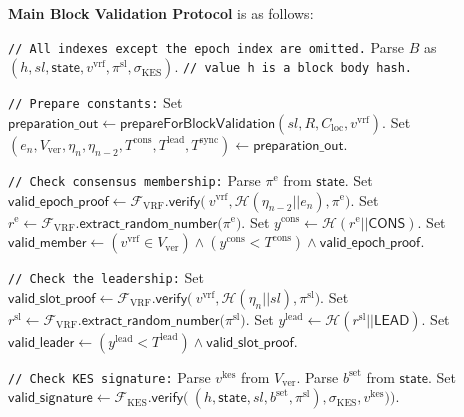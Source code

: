 \bigbreak
\bigbreak
\noindent
{}
\textbf{Main Block Validation Protocol}\label{apndx:block-validation-protocol} is as follows:
\begin{protocol}
    \caption{$\textsf{IsValidBlock}(P, \text{sid}, R, \mathcal{C}_{\text{loc}}, B, \{S_k^{\text{id}}\}_{k=1}^K, \{f^{\text{lead}}_k\}_{k=1}^K, \{f^{\text{cons}}_k\}_{k=1}^K)$}
    \begin{algorithmic}[1]
        \noindent
        \lstinline|// All indexes except the epoch index are omitted.|
        \State Parse $B$ as ${(h, sl, \textsf{state}, v^{\text{vrf}}, \pi^{\text{sl}}, \sigma_{\text{KES}})}$. \lstinline|// value h is a block body hash.|

        \noindent
        \lstinline|// Prepare constants:|
        \State Set $\textsf{preparation\_out} \leftarrow \textsf{prepareForBlockValidation}(sl, R, C_{\text{loc}}, v^{\text{vrf}})$.
        \State Set $(e_n, V_{\text{ver}}, \eta_{n}, \eta_{n - 2}, T^{\text{cons}}, T^{\text{lead}}, T^{\text{sync}}) \leftarrow \textsf{preparation\_out}$.

        \noindent
        \lstinline|// Check consensus membership:|
        \State Parse ${\pi^{\text{e}}}$ from $\textsf{state}$.
        \State Set $\textsf{valid\_epoch\_proof} \leftarrow \mathcal{F}_{\text{VRF}}\textsf{.verify(}\
        v^{\text{vrf}}, \mathcal{H}(\eta_{n - 2} || e_n),\pi^{\text{e}} \textsf{)}$.
        \State Set ${r^{\text{e}} \leftarrow \mathcal{F}_{\text{VRF}}\textsf{.extract\_random\_number(}\pi^{\text{e}}\textsf{)}}$.
        \State Set ${y^{\text{cons}} \leftarrow {\mathcal{H}(r^{\text{e}} || \textsf{CONS})}}$.
        \State Set ${\textsf{valid\_member} \leftarrow (v^{\text{vrf}} \in V_{\text{ver}}) \wedge (y^{\text{cons}} < T^{\text{cons}}) \wedge \textsf{valid\_epoch\_proof}}$.

        \noindent
        \lstinline|// Check the leadership:|
        \State Set $\textsf{valid\_slot\_proof} \leftarrow \mathcal{F}_{\text{VRF}}\textsf{.verify(}\
        v^{\text{vrf}}, \mathcal{H}(\eta_n || sl),\pi^{\text{sl}} \textsf{)}$.
        \State Set ${r^{\text{sl}} \leftarrow \mathcal{F}_{\text{VRF}}\textsf{.extract\_random\_number(}\pi^{\text{sl}}\textsf{)}}$.
        \State Set ${y^{\text{lead}} \leftarrow {\mathcal{H}(r^{\text{sl}} || \textsf{LEAD})}}$.
        \State Set ${\textsf{valid\_leader} \leftarrow (y^{\text{lead}} < T^{\text{lead}}) \wedge \textsf{valid\_slot\_proof}}$.

        \noindent
        \lstinline|// Check KES signature:|
        \State Parse $v^{\text{kes}}$ from $V_{\text{ver}}$.
        \State Parse $b^{\text{set}}$ from $\textsf{state}$.
        \State Set $\textsf{valid\_signature} \leftarrow \mathcal{F}_{\text{KES}}\textsf{.verify(}\
        (h, \textsf{state}, sl, b^{\text{set}}, \pi^{\text{sl}}), \sigma_{\text{KES}}, v^{\text{kes}}) \textsf{)}$.


\end{algorithmic}
\end{protocol}
